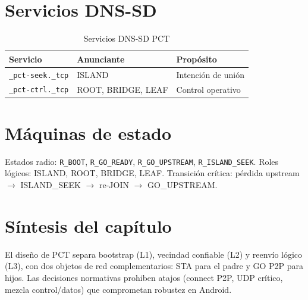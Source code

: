 \section{Servicios DNS-SD}
\label{sec:dns-sd-diseno}

\begin{table}[htbp]
  \centering
  \caption{Servicios DNS-SD PCT}
  \label{tab:dns-sd}
  \begin{tabular}{@{}lll@{}}
    \toprule
    \textbf{Servicio} & \textbf{Anunciante} & \textbf{Propósito} \\
    \midrule
    \texttt{\_pct-seek.\_tcp}  & ISLAND  & Intención de unión \\
    \texttt{\_pct-ctrl.\_tcp}  & ROOT, BRIDGE, LEAF & Control operativo \\
    \bottomrule
  \end{tabular}
\end{table}

\section{Máquinas de estado}
\label{sec:maquinas-estado}

Estados radio: \texttt{R\_BOOT}, \texttt{R\_GO\_READY}, \texttt{R\_GO\_UPSTREAM}, \texttt{R\_ISLAND\_SEEK}. Roles lógicos: ISLAND, ROOT, BRIDGE, LEAF. Transición crítica: pérdida upstream $\rightarrow$ ISLAND\_SEEK $\rightarrow$ re-JOIN $\rightarrow$ GO\_UPSTREAM.

\section{Síntesis del capítulo}
\label{sec:sintesis-analisis-diseno}

El diseño de PCT separa bootstrap (L1), vecindad confiable (L2) y reenvío lógico (L3), con dos objetos de red complementarios: STA para el padre y GO P2P para hijos. Las decisiones normativas prohiben atajos (connect P2P, UDP crítico, mezcla control/datos) que comprometan robustez en Android.
